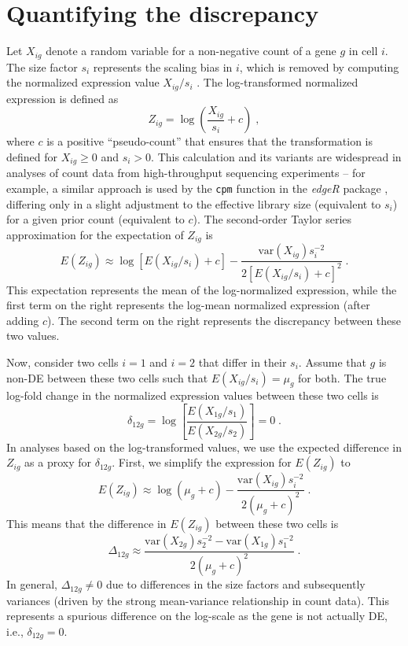 \documentclass[10pt,letterpaper]{article}
\newcommand\code[1]{{\small\texttt{#1}}}
\begin{document}
\section{Quantifying the discrepancy}
Let $X_{ig}$ denote a random variable for a non-negative count of a gene $g$ in cell $i$.
The size factor $s_i$ represents the scaling bias in $i$, which is removed by computing the normalized expression value $X_{ig}/s_i$ \cite{anders2010differential}.
The log-transformed normalized expression is defined as 
\[
Z_{ig} = \log\left(\frac{X_{ig}}{s_i}+ c\right) \;,
\]
where $c$ is a positive ``pseudo-count'' that ensures that the transformation is defined for $X_{ig} \ge 0$ and $s_i > 0$.
This calculation and its variants are widespread in analyses of count data from high-throughput sequencing experiments -- for example, a similar approach is used by the \code{cpm} function in the \textit{edgeR} package \cite{robinson2010edgeR}, differing only in a slight adjustment to the effective library size (equivalent to $s_i$) for a given prior count (equivalent to $c$).
The second-order Taylor series approximation for the expectation of $Z_{ig}$ is
\[
E(Z_{ig}) \approx \log[E(X_{ig}/s_i) + c] - \frac{\mbox{var}(X_{ig})s_i^{-2}}{2[E(X_{ig}/s_i) + c]^2} \;.
\]
This expectation represents the mean of the log-normalized expression, while the first term on the right represents the log-mean normalized expression (after adding $c$). 
The second term on the right represents the discrepancy between these two values.

Now, consider two cells $i=1$ and $i=2$ that differ in their $s_i$.
Assume that $g$ is non-DE between these two cells such that $E(X_{ig}/s_i)=\mu_g$ for both.
The true log-fold change in the normalized expression values between these two cells is
\[
\delta_{12g} = \log\left[ \frac{E(X_{1g}/s_1)}{E(X_{2g}/s_2)} \right] = 0 \;.
\]
In analyses based on the log-transformed values, we use the expected difference in $Z_{ig}$ as a proxy for $\delta_{12g}$.
First, we simplify the expression for $E(Z_{ig})$ to
\[
E(Z_{ig}) \approx \log(\mu_g + c) - \frac{\mbox{var}(X_{ig})s_i^{-2}}{2(\mu_g + c)^2} \;.
\]
This means that the difference in $E(Z_{ig})$ between these two cells is 
\begin{equation}
\Delta_{12g} \approx \frac{\mbox{var}(X_{2g})s_2^{-2} -  \mbox{var}(X_{1g})s_1^{-2}}{2(\mu_g + c)^2} \;. \label{eqn:spuriousdiff}
\end{equation}
In general, $\Delta_{12g} \neq 0$ due to differences in the size factors and subsequently variances (driven by the strong mean-variance relationship in count data).
This represents a spurious difference on the log-scale as the gene is not actually DE, i.e., $\delta_{12g}=0$.
\end{document}

